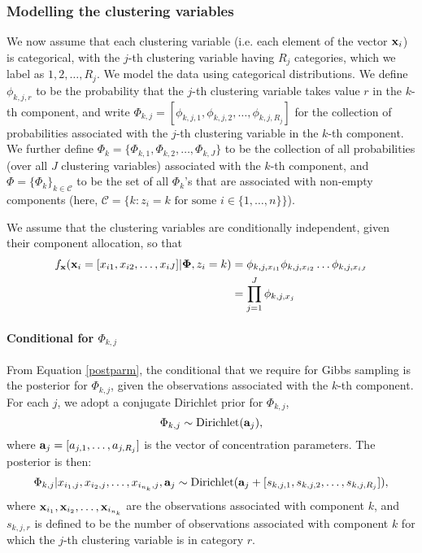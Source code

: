 \documentclass[12pt]{article}
\begin{document}
\subsubsection{Modelling the clustering variables}
We now assume that each clustering variable (i.e. each element of the vector ${\bf x}_i$) is categorical, with the $j$-th clustering variable having $R_j$ categories, which we label as $1, 2, \ldots, R_j$.  We model the data using categorical distributions.  We define $\phi_{k,j,r}$ to be the probability that the $j$-th clustering variable takes value $r$ in the $k$-th component, and write $\Phi_{k,j} = [\phi_{k,j,1}, \phi_{k,j,2}, \ldots, \phi_{k,j,R_j} ]$ for the collection of probabilities associated with the $j$-th clustering variable in the $k$-th component.  We further define $\Phi_{k} = \{\Phi_{k,1}, \Phi_{k,2}, \ldots, \Phi_{k,J}\}$ to be the collection of all probabilities (over all $J$ clustering variables) associated with the $k$-th component, and $\Phi = \{ \Phi_{k} \}_{k\in \mathcal{C}}$ to be the set of all $\Phi_{k}$'s that are associated with non-empty components (here, $\mathcal{C} = \{k: z_i = k \mbox{ for some } i \in \{1,\ldots,n\}\}$).  

We assume that the clustering variables are conditionally independent, given their component allocation, so that 
\begin{align}      
 f_{\bf x}({\bf x}_i = [x_{i1}, x_{i2}, \ldots, x_{iJ}]|\boldsymbol{\Phi}, z_i = k) &= \phi_{k,j,x_{i1}} \phi_{k,j,x_{i2}} \ldots \phi_{k,j,x_{iJ}}\\
 &= \prod_{j = 1}^J  \phi_{k,j,x_j}\label{likeliprod}
\end{align}

\paragraph{Conditional for $\Phi_{k,j}$}
From Equation \eqref{postparm}, the conditional that we require for Gibbs sampling is the posterior for $\Phi_{k,j}$, given the observations associated with the $k$-th component.  For each $j$, we adopt a conjugate Dirichlet prior for $\Phi_{k,j}$, $$\Phi_{k,j} \sim \mbox{Dirichlet}({\bf a}_j),$$ where ${\bf a}_j = [a_{j,1}, \ldots, a_{j,R_j}]$ is the vector of concentration parameters.
The posterior is then:
\begin{align}
\Phi_{k,j}|{ x}_{i_1,j}, { x}_{i_2,j}, \ldots, { x}_{i_{n_k},j}, {\bf a}_j \sim \mbox{Dirichlet}({\bf a}_j + [s_{k,j,1}, s_{k,j,2}, \ldots, s_{k,j,R_j}]),
\end{align}
where ${\bf x}_{i_1}, {\bf x}_{i_2}, \ldots, {\bf x}_{i_{n_k}}$ are the observations associated with component $k$, and $s_{k,j,r}$ is defined to be the number of observations associated with component $k$ for which the $j$-th clustering variable is in category $r$.  
\end{document}
